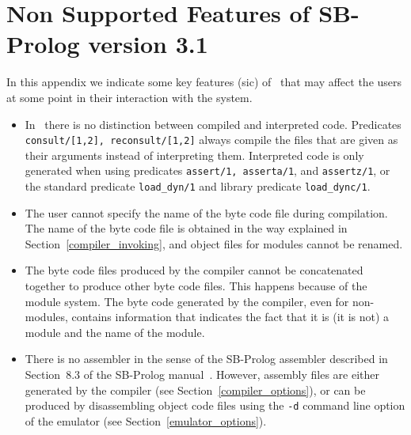 \chapter{Non Supported Features of SB-Prolog version 3.1}

In this appendix we indicate some key features (sic) of \ourprolog\
that may affect the users at some point in their interaction with 
the system.  

\begin{itemize} 
\item	In \ourprolog\, there is no distinction between compiled and 
	interpreted code.  Predicates {\tt consult/[1,2], reconsult/[1,2]} 
	always compile the files that are given as their arguments instead 
	of interpreting them.  Interpreted code is only generated when
	using predicates {\tt assert/1, asserta/1}, and {\tt assertz/1}, or
	the standard predicate {\tt load\_dyn/1} and library predicate
	{\tt load\_dync/1}.
\item	The user cannot specify the name of the byte code file during 
	compilation.  The name of the byte code file is obtained in the way 
	explained in Section~\ref{compiler_invoking}, and object files for
	modules cannot be renamed.
\item	The byte code files produced by the compiler cannot be concatenated 
	together to produce other byte code files.  This happens because
	of the module system.  The byte code generated by the compiler,
	even for non-modules, contains information that indicates the fact
	that it is (it is not) a module and the name of the module.
\item	There is no assembler in the sense of the SB-Prolog assembler 
	described in Section~8.3 of the SB-Prolog manual~\cite{sbprolog}.
	However, assembly files are either generated by the compiler 
	(see Section~\ref{compiler_options}), or can be produced by 
	disassembling object code files using the {\tt -d} command line
	option of the emulator (see Section~\ref{emulator_options}).
\end{itemize}
